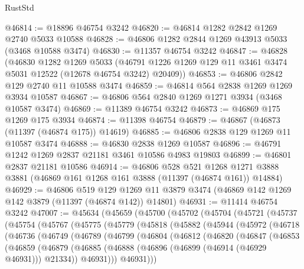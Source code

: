\begin{lexlean}{RustStd}
\begin{coremodule}
@46814 := @18896 @46754 @3242
@46820 := @46814 @1282 @2842 @1269 @2740 @5033 @10588
@46828 := @46806 @1282 @2844 @1269 @43913 @5033 (@3468 @10588 @3474)
@46830 := @11357 @46754 @3242
@46847 := @46828
    (@46830
      @1282
      @1269
      @5033
      (@46791 @1226 @1269 @129 @11 @3461 @3474 @5031 @12522 (@12678 @46754 @3242) @20409))
@46853 := @46806 @2842 @129 @2740 @11 @10588 @3474
@46859 := @46814 @564 @2838 @1269 @1269 @3934 @10587
@46867 := @46806 @564 @2840 @1269 @1271 @3934 (@3468 @10587 @3474)
@46869 := @11389 @46754 @3242
@46873 := @46869 @175 @1269 @175 @3934
@46874 := @11398 @46754
@46879 := @46867 (@46873 (@11397 (@46874 @175)) @14619)
@46885 := @46806 @2838 @129 @1269 @11 @10587 @3474
@46888 := @46830 @2838 @1269 @10587
@46896 := @46791 @1242 @1269 @2837 @21181 @3461 @10586 @4983 @19803
@46899 := @46801 @2837 @21181 @10586
@46914 := @46806
    @528
    @521
    @1268
    @1271
    @3888
    @3881
    (@46869 @161 @1268 @161 @3888 (@11397 (@46874 @161)) @14884)
@46929 := @46806
    @519
    @129
    @1269
    @11
    @3879
    @3474
    (@46869 @142 @1269 @142 @3879 (@11397 (@46874 @142)) @14801)
@46931 := @11414 @46754 @3242
@47007 := @45634
    (@45659
      (@45700
        (@45702
          (@45704
            (@45721
              (@45737
                (@45754
                  (@45767
                    (@45775
                      (@45779
                        (@45818
                          (@45882
                            (@45944
                              (@45972
                                (@46718
                                  (@46736
                                    (@46749
                                      (@46789
                                        (@46799
                                          (@46804
                                            (@46812
                                              (@46820
                                                (@46847
                                                  (@46853
                                                    (@46859
                                                      (@46879
                                                        (@46885
                                                          (@46888
                                                            (@46896
                                                              (@46899 (@46914 (@46929 @46931)))
                                                              @21334))
                                                          @46931)))
                                                    @46931)))

\end{coremodule}
\end{lexlean}
